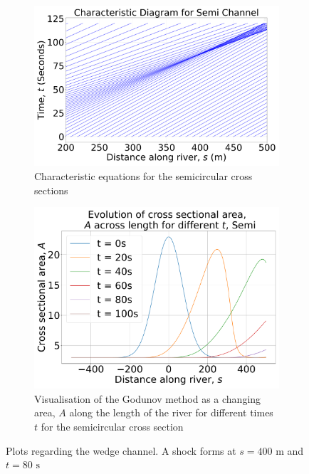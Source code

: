 \documentclass[12pt]{article}
\begin{document}
\begin{figure}[H]
    \centering
    \begin{subfigure}[b]{0.49\textwidth}
        \centering
        \includegraphics[width=\textwidth]{Figures/Semi_characteristic.pdf}
        \caption{Characteristic equations for the semicircular cross sections}
        \label{fig:semi_char}
    \end{subfigure}
    \hfill
    \begin{subfigure}[b]{0.49\textwidth}
        \centering
        \includegraphics[width=\textwidth]{Figures/Semi_godunov.pdf}
        \caption{Visualisation of the Godunov method as a changing area, $A$ along the length of the river for different times $t$ for the semicircular cross section}
        \label{fig:semi_godunov}
    \end{subfigure}
    \caption{Plots regarding the wedge channel. A shock forms at $s= 400\text{ m}$ and $t= 80\text{ s}$}
\end{figure}
\end{document}
